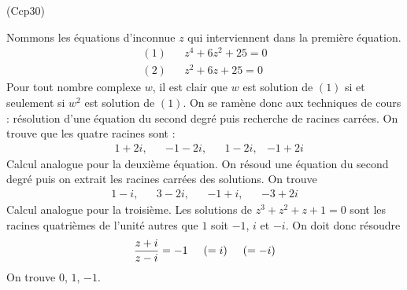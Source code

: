 \begin{tiny}(Ccp30)\end{tiny} Nommons les équations d'inconnue $z$ qui interviennent dans la première équation.
\begin{align*}
 (1)& &z^4+6z^2+25=0\\
 (2)& &z^2+6z+25=0
\end{align*}
Pour tout nombre complexe $w$, il est clair que $w$ est solution de $(1)$ si et seulement si $w^2$ est solution de $(1)$. On se ramène donc aux techniques de cours : résolution d'une équation du second degré puis recherche de racines carrées. On trouve que les quatre racines sont :
\begin{align*}
 &1+2i,& &-1-2i,& &1-2i, &-1+2i 
\end{align*}
Calcul analogue pour la deuxième équation. On résoud une équation du second degré puis on extrait les racines carrées des solutions. On trouve
\begin{align*}
 1-i, & & 3-2i, & & -1+i, & & -3+2i
\end{align*}
Calcul analogue pour la troisième. Les solutions de $z^3+z^2+z+1=0$ sont les racines quatrièmes de l'unité autres que $1$ soit $-1$, $i$ et $-i$. On doit donc résoudre
\begin{displaymath}
 \frac{z+i}{z-i} = -1 \hspace{0.5cm}(= i) \hspace{0.5cm}(= -i)
\end{displaymath}
On trouve $0$, $1$, $-1$.